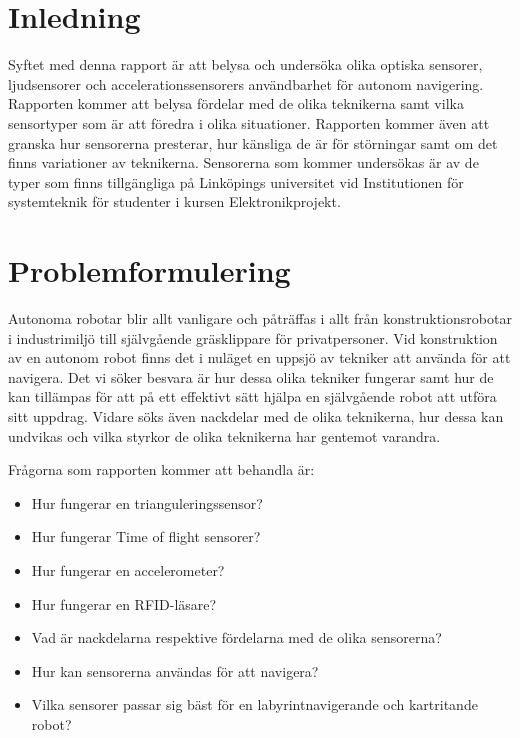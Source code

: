 \documentclass[a4paper,12pt,fleqn]{article}
\begin{document}
\addto\captionsswedish{\renewcommand{\contentsname}{Innehållsförteckning}}

\tableofcontents
\thispagestyle{fancy}
\newpage

\section{Inledning}
Syftet med denna rapport är att belysa och undersöka olika optiska sensorer, ljudsensorer och accelerationssensorers användbarhet för autonom navigering.
Rapporten kommer att belysa fördelar med de olika teknikerna samt vilka sensortyper som är att föredra i olika situationer.
Rapporten kommer även att granska hur sensorerna presterar, hur känsliga de är för störningar samt om det finns variationer av teknikerna.
Sensorerna som kommer undersökas är av de typer som finns tillgängliga på Linköpings universitet vid Institutionen för systemteknik för studenter i kursen Elektronikprojekt.


\section{Problemformulering}
Autonoma robotar blir allt vanligare och påträffas i allt från konstruktionsrobotar i industrimiljö till självgående gräsklippare för privatpersoner.
Vid konstruktion av en autonom robot finns det i nuläget  en uppsjö av tekniker att använda för att navigera. Det vi söker besvara är hur dessa olika tekniker fungerar samt hur de kan tillämpas för att på ett effektivt sätt hjälpa en självgående robot att utföra sitt uppdrag.
Vidare söks även nackdelar med de olika teknikerna, hur dessa kan undvikas och vilka styrkor de olika teknikerna har gentemot varandra.

Frågorna som rapporten kommer att behandla är:
\begin{itemize}

\item Hur fungerar en trianguleringssensor? 

\item Hur fungerar Time of flight sensorer?

\item Hur fungerar en accelerometer? 

\item Hur fungerar en RFID-läsare?

\item Vad är nackdelarna respektive fördelarna med de olika sensorerna?

\item Hur kan sensorerna användas för att navigera?
\item Vilka sensorer passar sig bäst för en labyrintnavigerande och kartritande robot?
\end{itemize}
\end{document}

